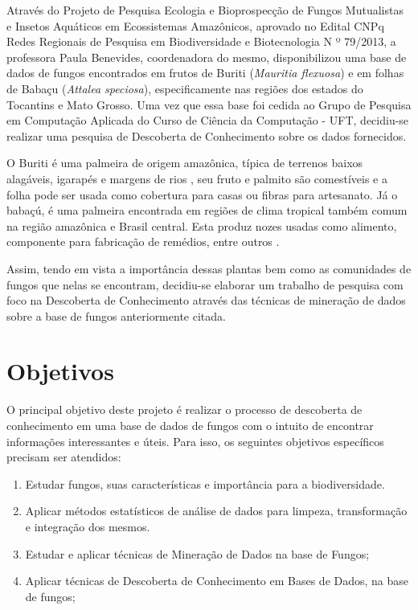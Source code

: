 \documentclass[tcc2,project]{classe_uftex/uftex}
\begin{document}
 \quad Através do Projeto de Pesquisa Ecologia e Bioprospecção de Fungos Mutualistas e Insetos Aquáticos em Ecossistemas Amazônicos, aprovado no Edital CNPq Redes Regionais de Pesquisa em Biodiversidade e Biotecnologia N º 79/2013, a professora Paula Benevides, coordenadora do mesmo, disponibilizou uma base de dados de fungos encontrados em frutos de Buriti (\emph{Mauritia flexuosa}) e em folhas de Babaçu (\emph{Attalea speciosa}), especificamente nas regiões dos estados do Tocantins e Mato Grosso. Uma vez que essa base foi cedida ao Grupo de Pesquisa em Computação Aplicada do Curso de Ciência da Computação - UFT, decidiu-se realizar uma pesquisa de Descoberta de Conhecimento sobre os dados fornecidos.

\quad O Buriti é uma palmeira de origem amazônica, típica de terrenos baixos alagáveis, igarapés e margens de rios \cite{2018:Ferreira}, seu fruto e palmito são comestíveis e a folha pode ser usada como cobertura para casas ou fibras para artesanato. Já o babaçú, é uma palmeira encontrada em regiões de clima tropical também comum na região amazônica e Brasil central. Esta produz nozes usadas como alimento, componente para fabricação de remédios, entre outros \cite{babcu:babcu}. 

\quad Assim, tendo em vista a importância dessas plantas bem como as comunidades de fungos que nelas se encontram, decidiu-se elaborar um trabalho de pesquisa com foco na Descoberta de Conhecimento através das técnicas de mineração de dados sobre a base de fungos anteriormente citada.

\section*{Objetivos}
\label{sec:objetivos}

\quad O principal objetivo deste projeto é realizar o processo de descoberta de conhecimento em uma base de dados de fungos com o intuito de encontrar informações interessantes e úteis. Para isso, os seguintes objetivos específicos precisam ser atendidos:

\begin{enumerate}
    \item Estudar fungos, suas características e importância para a biodiversidade.
    \item Aplicar métodos estatísticos de análise de dados para limpeza, transformação e integração dos mesmos.
    \item Estudar e aplicar técnicas de Mineração de Dados na base de Fungos;
	\item Aplicar técnicas de Descoberta de Conhecimento em Bases de Dados, na base de fungos;
\end{enumerate}
\end{document}
